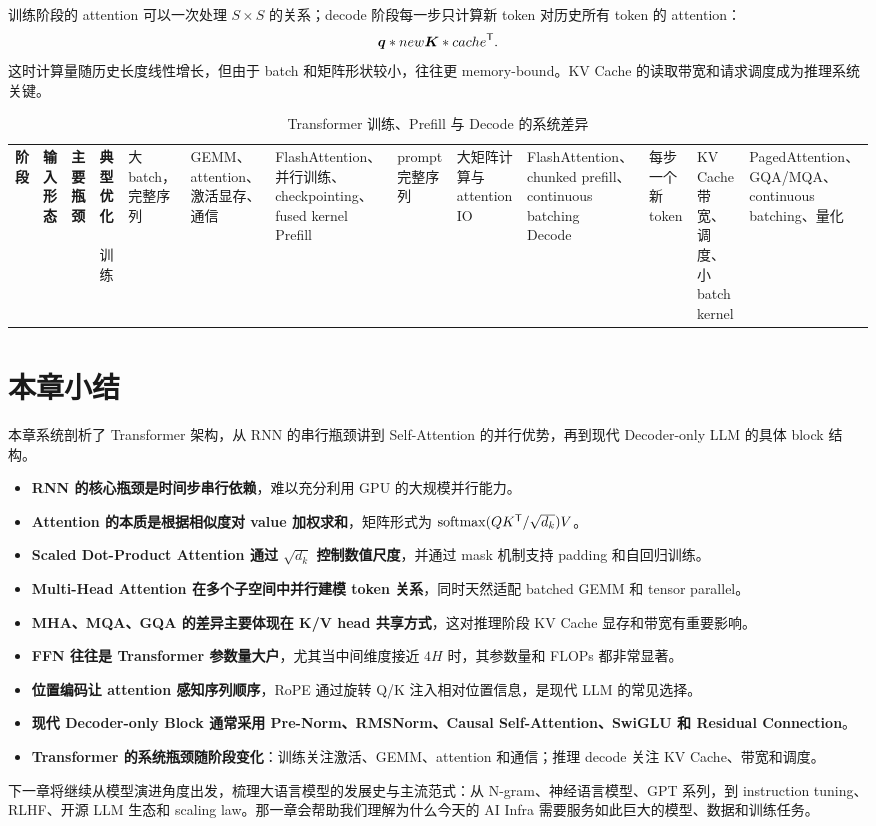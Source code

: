 训练阶段的 attention 可以一次处理 $S\times S$ 的关系；decode 阶段每一步只计算新 token 对历史所有 token 的 attention：
\[
\bm{q}*{new}\bm{K}*{cache}^{\mathsf{T}}.
\]
这时计算量随历史长度线性增长，但由于 batch 和矩阵形状较小，往往更 memory-bound。KV Cache 的读取带宽和请求调度成为推理系统关键。

\begin{table}[H]
\centering
\small
\caption{Transformer 训练、Prefill 与 Decode 的系统差异}
\label{tab:training-prefill-decode}
\begin{tabular}{p{}p{}p{}p{}}
\toprule
\textbf{阶段} & \textbf{输入形态} & \textbf{主要瓶颈} & \textbf{典型优化} \
\midrule
训练
& 大 batch，完整序列
& GEMM、attention、激活显存、通信
& FlashAttention、并行训练、checkpointing、fused kernel \
\midrule
Prefill
& prompt 完整序列
& 大矩阵计算与 attention IO
& FlashAttention、chunked prefill、continuous batching \
\midrule
Decode
& 每步一个新 token
& KV Cache 带宽、调度、小 batch kernel
& PagedAttention、GQA/MQA、continuous batching、量化 \
\bottomrule
\end{tabular}
\end{table}

\section{本章小结}
\label{sec:chapter04-summary}

本章系统剖析了 Transformer 架构，从 RNN 的串行瓶颈讲到 Self-Attention 的并行优势，再到现代 Decoder-only LLM 的具体 block 结构。

\begin{itemize}
\item \textbf{RNN 的核心瓶颈是时间步串行依赖}，难以充分利用 GPU 的大规模并行能力。
\item \textbf{Attention 的本质是根据相似度对 value 加权求和}，矩阵形式为 $\operatorname{softmax}(QK^{\mathsf{T}}/\sqrt{d_k})V$。
\item \textbf{Scaled Dot-Product Attention 通过 $\sqrt{d_k}$ 控制数值尺度}，并通过 mask 机制支持 padding 和自回归训练。
\item \textbf{Multi-Head Attention 在多个子空间中并行建模 token 关系}，同时天然适配 batched GEMM 和 tensor parallel。
\item \textbf{MHA、MQA、GQA 的差异主要体现在 K/V head 共享方式}，这对推理阶段 KV Cache 显存和带宽有重要影响。
\item \textbf{FFN 往往是 Transformer 参数量大户}，尤其当中间维度接近 $4H$ 时，其参数量和 FLOPs 都非常显著。
\item \textbf{位置编码让 attention 感知序列顺序}，RoPE 通过旋转 Q/K 注入相对位置信息，是现代 LLM 的常见选择。
\item \textbf{现代 Decoder-only Block 通常采用 Pre-Norm、RMSNorm、Causal Self-Attention、SwiGLU 和 Residual Connection}。
\item \textbf{Transformer 的系统瓶颈随阶段变化}：训练关注激活、GEMM、attention 和通信；推理 decode 关注 KV Cache、带宽和调度。
\end{itemize}

下一章将继续从模型演进角度出发，梳理大语言模型的发展史与主流范式：从 N-gram、神经语言模型、GPT 系列，到 instruction tuning、RLHF、开源 LLM 生态和 scaling law。那一章会帮助我们理解为什么今天的 AI Infra 需要服务如此巨大的模型、数据和训练任务。
